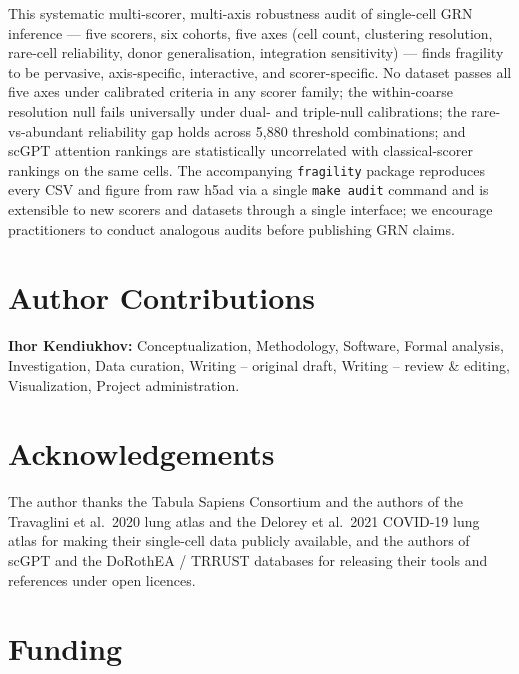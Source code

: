\documentclass[12pt]{article}
\begin{document}
This systematic multi-scorer, multi-axis robustness audit of
single-cell GRN inference --- five scorers, six cohorts, five axes
(cell count, clustering resolution, rare-cell reliability, donor
generalisation, integration sensitivity) --- finds fragility to be
pervasive, axis-specific, interactive, and scorer-specific. No dataset
passes all five axes under calibrated criteria in any scorer family;
the within-coarse resolution null fails universally under dual- and
triple-null calibrations; the rare-vs-abundant reliability gap holds
across 5{,}880 threshold combinations; and scGPT attention rankings
are statistically uncorrelated with classical-scorer rankings on the
same cells. The accompanying \texttt{fragility} package reproduces
every CSV and figure from raw h5ad via a single \texttt{make audit}
command and is extensible to new scorers and datasets through a single
interface; we encourage practitioners to conduct analogous audits
before publishing GRN claims.

\section*{Author Contributions}

\textbf{Ihor Kendiukhov:} Conceptualization, Methodology, Software,
Formal analysis, Investigation, Data curation, Writing -- original
draft, Writing -- review \& editing, Visualization, Project administration.

\section*{Acknowledgements}

The author thanks the Tabula Sapiens Consortium and the authors of
the Travaglini et al.\ 2020 lung atlas and the Delorey et al.\ 2021
COVID-19 lung atlas for making their single-cell data publicly
available, and the authors of scGPT and the DoRothEA / TRRUST
databases for releasing their tools and references under open
licences.

\section*{Funding}
\end{document}
